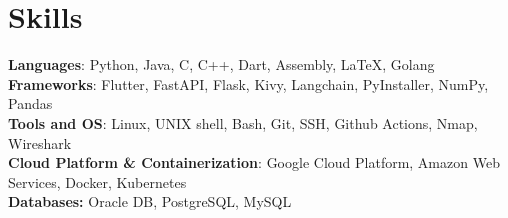 

\resumeSubHeadingListEnd

%
\vspace{-10px}
\section{Skills}
\begin{itemize}[leftmargin=0.15in, label={}]
  \small{\item{
        \textbf{Languages}{: Python, Java, C, C++, Dart, Assembly, LaTeX, Golang} \\
        \textbf{Frameworks}{: Flutter, FastAPI, Flask, Kivy, Langchain, PyInstaller, NumPy, Pandas} \\
        \textbf{Tools and OS}{: Linux, UNIX shell, Bash, Git, SSH, Github Actions, Nmap, Wireshark} \\
        \textbf{Cloud Platform \& Containerization}{: Google Cloud Platform, Amazon Web Services, Docker, Kubernetes} \\
        \textbf{Databases: }{Oracle DB, PostgreSQL, MySQL} \\
        }}

\end{itemize}


